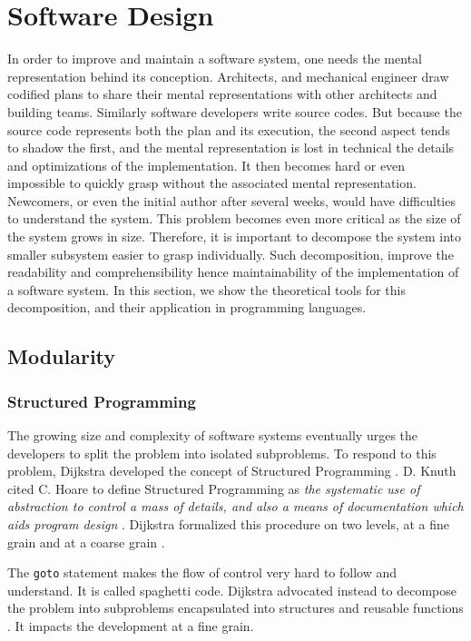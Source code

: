 \section{Software Design}

In order to improve and maintain a software system, one needs the mental representation behind its conception.
Architects, and mechanical engineer draw codified plans to share their mental representations with other architects and building teams.
Similarly software developers write source codes.
But because the source code represents both the plan and its execution, the second aspect tends to shadow the first, and the mental representation is lost in technical the details and optimizations of the implementation.
It then becomes hard or even impossible to quickly grasp without the associated mental representation.
Newcomers, or even the initial author after several weeks, would have difficulties to understand the system.
This problem becomes even more critical as the size of the system grows in size.
Therefore, it is important to decompose the system into smaller subsystem easier to grasp individually.
Such decomposition, improve the readability and comprehensibility hence maintainability of the implementation of a software system.
In this section, we show the theoretical tools for this decomposition, and their application in programming languages.

\subsection{Modularity}

\subsubsection{Structured Programming}

The growing size and complexity of software systems eventually urges the developers to split the problem into isolated subproblems.
To respond to this problem, Dijkstra developed the concept of Structured Programming \cite{Dijkstra1970}.
D. Knuth cited C. Hoare to define Structured Programming as \textit{the systematic use of abstraction to control a mass of details, and also a means of documentation which aids program design} \cite{Knuth1974}.
Dijkstra formalized this procedure on two levels, at a fine grain and at a coarse grain \cite{Dijkstra1968a,Dijkstra1968}.

The \texttt{goto} statement makes the flow of control very hard to follow and understand.
It is called spaghetti code.
Dijkstra advocated instead to decompose the problem into subproblems encapsulated into  structures and reusable functions \cite{Dijkstra1968a}.
It impacts the development at a fine grain.

